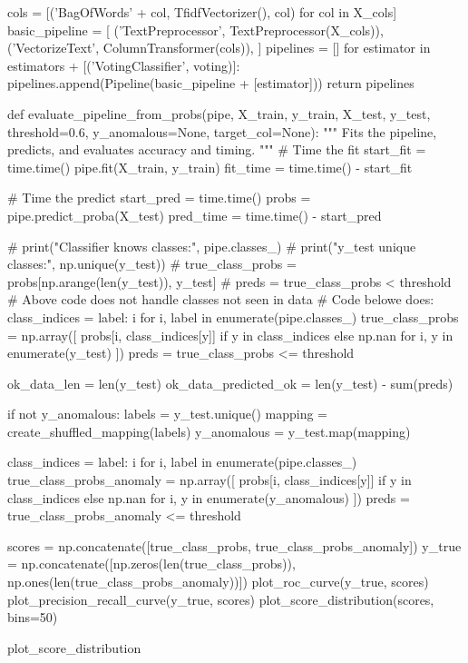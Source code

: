 {{    cols = [('BagOfWords' + col, TfidfVectorizer(), col) for col in X_cols]
    basic_pipeline = [
        ('TextPreprocessor', TextPreprocessor(X_cols)),
        ('VectorizeText', ColumnTransformer(cols)),
    ]
    pipelines = []
    for estimator in estimators + [('VotingClassifier', voting)]:
        pipelines.append(Pipeline(basic_pipeline + [estimator]))
    return pipelines


def evaluate_pipeline_from_probs(pipe, X_train, y_train, X_test, y_test, threshold=0.6, y_anomalous=None, target_col=None):
    """
    Fits the pipeline, predicts, and evaluates accuracy and timing.
    """
    # Time the fit
    start_fit = time.time()
    pipe.fit(X_train, y_train)
    fit_time = time.time() - start_fit

    # Time the predict
    start_pred = time.time()
    probs = pipe.predict_proba(X_test)
    pred_time = time.time() - start_pred

    # print("Classifier knows classes:", pipe.classes_)
    # print("y_test unique classes:", np.unique(y_test))
    # true_class_probs = probs[np.arange(len(y_test)), y_test]
    # preds = true_class_probs < threshold
    # Above code does not handle classes not seen in data
    # Code belowe does:
    class_indices = {label: i for i, label in enumerate(pipe.classes_)}
    true_class_probs = np.array([
        probs[i, class_indices[y]] if y in class_indices else np.nan
        for i, y in enumerate(y_test)
    ])
    preds = true_class_probs <= threshold

    ok_data_len = len(y_test)
    ok_data_predicted_ok = len(y_test) - sum(preds)

    if not y_anomalous:
        labels = y_test.unique()
        mapping = create_shuffled_mapping(labels)
        y_anomalous = y_test.map(mapping)

    class_indices = {label: i for i, label in enumerate(pipe.classes_)}
    true_class_probs_anomaly = np.array([
        probs[i, class_indices[y]] if y in class_indices else np.nan
        for i, y in enumerate(y_anomalous)
    ])
    preds = true_class_probs_anomaly <= threshold

    scores = np.concatenate([true_class_probs, true_class_probs_anomaly])
    y_true = np.concatenate([np.zeros(len(true_class_probs)), np.ones(len(true_class_probs_anomaly))])
    plot_roc_curve(y_true, scores)
    plot_precision_recall_curve(y_true, scores)
    plot_score_distribution(scores, bins=50)
    
    
    plot_score_distribution

}}
